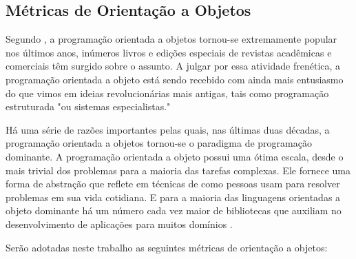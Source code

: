 \subsection{Métricas de Orientação a Objetos}

Segundo , a programação orientada a objetos tornou-se extremamente popular nos últimos anos, inúmeros livros e edições especiais de revistas acadêmicas e comerciais têm surgido sobre o assunto. A julgar por essa atividade frenética, a programação orientada a objeto está sendo recebido com ainda mais entusiasmo do que vimos em ideias revolucionárias mais antigas, tais como programação estruturada "ou sistemas especialistas." 

Há uma série de razões importantes pelas quais, nas últimas duas décadas, a  
programação orientada a objetos tornou-se o paradigma de programação dominante. A programação orientada a objeto possui uma ótima escala, desde o mais trivial dos problemas para a maioria das tarefas complexas. Ele fornece uma forma de abstração que reflete em técnicas de como pessoas usam para resolver problemas em sua vida cotidiana. E para a maioria das linguagens orientadas a objeto dominante há um número cada vez maior de bibliotecas que auxiliam no desenvolvimento de aplicações para muitos domínios \cite{budd_introduction_2002}.

Serão adotadas neste trabalho as seguintes métricas de orientação a objetos:

